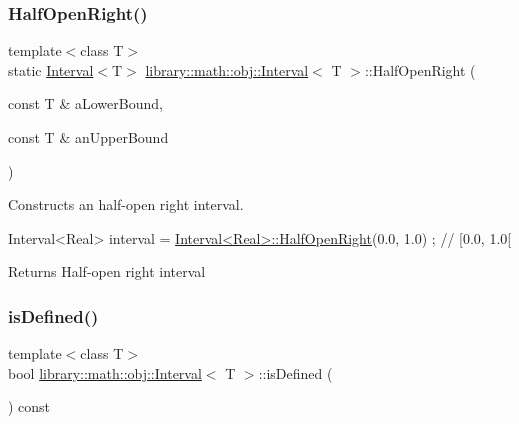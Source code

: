 \subsubsection{\texorpdfstring{Half\+Open\+Right()}{HalfOpenRight()}}
{\footnotesize\ttfamily template$<$class T$>$ \\
static \hyperlink{classlibrary_1_1math_1_1obj_1_1_interval}{Interval}$<$T$>$ \hyperlink{classlibrary_1_1math_1_1obj_1_1_interval}{library\+::math\+::obj\+::\+Interval}$<$ T $>$\+::Half\+Open\+Right (\begin{DoxyParamCaption}\item[{const T \&}]{a\+Lower\+Bound,  }\item[{const T \&}]{an\+Upper\+Bound }\end{DoxyParamCaption})\hspace{0.3cm}{\ttfamily [static]}}



Constructs an half-\/open right interval. 


\begin{DoxyCode}
Interval<Real> interval = \hyperlink{classlibrary_1_1math_1_1obj_1_1_interval_a1a15d0518cc69fa3e442fc39c0622477}{Interval<Real>::HalfOpenRight}(0.0, 1.0) ; \textcolor{comment}{// [0.0,
       1.0[}
\end{DoxyCode}


\begin{DoxyReturn}{Returns}
Half-\/open right interval 
\end{DoxyReturn}
\mbox{\label{classlibrary_1_1math_1_1obj_1_1_interval_a2de37bb9d7b97ae7892188c26c99b6fb}} 
\subsubsection{\texorpdfstring{is\+Defined()}{isDefined()}}
{\footnotesize\ttfamily template$<$class T$>$ \\
bool \hyperlink{classlibrary_1_1math_1_1obj_1_1_interval}{library\+::math\+::obj\+::\+Interval}$<$ T $>$\+::is\+Defined (\begin{DoxyParamCaption}{ }\end{DoxyParamCaption}) const}



